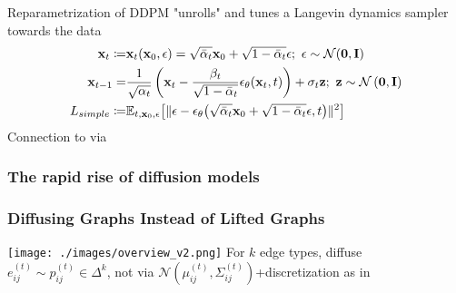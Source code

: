 \documentclass[./presentation.tex]{subfiles}
\begin{document}
\begin{frame}[label=diffusion]
{{  Reparametrization of DDPM \citep{hoDenoisingDiffusionProbabilistic2020f} "unrolls" and tunes a Langevin dynamics sampler towards the data
  \begin{align}
    \rvx_{t}\coloneqq&\func{\rvx_t}{\rvx_0,\mathbf{\epsilon}}=\sqrt{\bar{\alpha}_t}\rvx_0+\sqrt{1-\bar{\alpha}_t}\mathbf{\epsilon};\ \mathbf{\epsilon}\sim\func{\mathcal{N}}{\mathbf{0},\rvI}\nonumber\\
    \rvx_{t-1}=&\frac{1}{\sqrt{\alpha_t}}\left(\rvx_t-\frac{\beta_t}{\sqrt{1-\bar{\alpha}_t}}\func{\mathbf{\epsilon}_\theta}{\rvx_t,t}\right)+\sigma_t\rvz;\ \rvz\sim\mathcal{N}\left(\mathbf{0},\rvI \right)\nonumber\\
    L_{simple}\coloneqq&\mathbb{E}_{t,\rvx_0,\mathbf{\epsilon}}\bigl[ \Vert \mathbf{\epsilon}-\func{\mathbf{\epsilon}_\theta}{\sqrt{\bar{\alpha}_t}\rvx_0+\sqrt{1-\bar{\alpha}_t}\mathbf{\epsilon},t} \Vert^2 \bigr]\nonumber
  \end{align}
  Connection to \cite{niuPermutationInvariantGraph2020b} via \cite{songGenerativeModelingEstimating2019b}
}
}
\end{frame}
\begin{frame}[label=diffusion,t]
  \frametitle{The rapid rise of diffusion models}
\end{frame}


\begin{frame}[label=digress,c]
  \frametitle{Diffusing Graphs Instead of Lifted Graphs}
  \texttt{[image: ./images/overview\_v2.png]}
  For $k$ edge types, diffuse $e_{ij}^{(t)} \sim p_{ij}^{(t)}\in\Delta^k$, not via $\mathcal{N}\left(\mu_{ij}^{(t)},\Sigma_{ij}^{(t)}\right)$+discretization as in \cite{hoDenoisingDiffusionProbabilistic2020f}
\end{frame}
\end{document}
